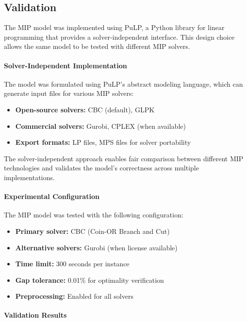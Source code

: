 \documentclass[11pt]{article}
\begin{document}
\subsection{Validation}

The MIP model was implemented using PuLP, a Python library for linear programming that provides a solver-independent interface. This design choice allows the same model to be tested with different MIP solvers.

\paragraph{Solver-Independent Implementation}

The model was formulated using PuLP's abstract modeling language, which can generate input files for various MIP solvers:
\begin{itemize}
    \item \textbf{Open-source solvers:} CBC (default), GLPK
    \item \textbf{Commercial solvers:} Gurobi, CPLEX (when available)
    \item \textbf{Export formats:} LP files, MPS files for solver portability
\end{itemize}

The solver-independent approach enables fair comparison between different MIP technologies and validates the model's correctness across multiple implementations.

\paragraph{Experimental Configuration}

The MIP model was tested with the following configuration:
\begin{itemize}
    \item \textbf{Primary solver:} CBC (Coin-OR Branch and Cut)
    \item \textbf{Alternative solvers:} Gurobi (when license available)
    \item \textbf{Time limit:} 300 seconds per instance
    \item \textbf{Gap tolerance:} 0.01\% for optimality verification
    \item \textbf{Preprocessing:} Enabled for all solvers
\end{itemize}

\paragraph{Validation Results}
\end{document}
